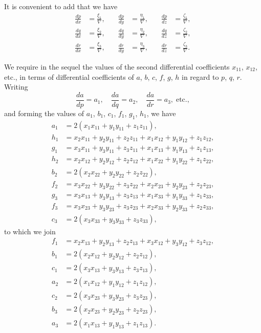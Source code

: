 \documentclass[11pt,a4paper]{article}
\theoremstyle{definition}
\theoremstyle{remark}
\begin{document}
It is convenient to add that we have
\[
\begin{aligned}
\frac{dp}{dx} &= \frac{\xi_1}{\nabla}, \quad &\frac{dp}{dy} &= \frac{\eta_1}{\nabla}, \quad &\frac{dp}{dz} &= \frac{\zeta_1}{\nabla}, \\
\frac{dq}{dx} &= \frac{\xi_2}{\nabla}, \quad &\frac{dq}{dy} &= \frac{\eta_2}{\nabla}, \quad &\frac{dq}{dz} &= \frac{\zeta_2}{\nabla}, \\
\frac{dr}{dx} &= \frac{\xi_3}{\nabla}, \quad &\frac{dr}{dy} &= \frac{\eta_3}{\nabla}, \quad &\frac{dr}{dz} &= \frac{\zeta_3}{\nabla}.
\end{aligned}
\]

We require in the sequel the values of the second differential coefficients $x_{11}$, $x_{12}$, etc., in terms of differential coefficients of $a$, $b$, $c$, $f$, $g$, $h$ in regard to $p$, $q$, $r$. Writing
\[
\frac{da}{dp} = a_1, \quad \frac{da}{dq} = a_2, \quad \frac{da}{dr} = a_3, \; \text{etc.},
\]
and forming the values of $a_1$, $b_1$, $c_1$, $f_1$, $g_1$, $h_1$, we have
\[
\begin{aligned}
a_1 &= 2(x_1 x_{11} + y_1 y_{11} + z_1 z_{11}), \\
h_1 &= x_2 x_{11} + y_2 y_{11} + z_2 z_{11} + x_1 x_{12} + y_1 y_{12} + z_1 z_{12}, \\
g_1 &= x_3 x_{11} + y_3 y_{11} + z_3 z_{11} + x_1 x_{13} + y_1 y_{13} + z_1 z_{13}, \\
h_2 &= x_2 x_{12} + y_2 y_{12} + z_2 z_{12} + x_1 x_{22} + y_1 y_{22} + z_1 z_{22}, \\
b_2 &= 2(x_2 x_{22} + y_2 y_{22} + z_2 z_{22}), \\
f_2 &= x_3 x_{22} + y_3 y_{22} + z_3 z_{22} + x_2 x_{23} + y_2 y_{23} + z_2 z_{23}, \\
g_3 &= x_3 x_{13} + y_3 y_{13} + z_3 z_{13} + x_1 x_{33} + y_1 y_{33} + z_1 z_{33}, \\
f_3 &= x_3 x_{23} + y_3 y_{23} + z_3 z_{23} + x_2 x_{33} + y_2 y_{33} + z_2 z_{33}, \\
c_3 &= 2(x_3 x_{33} + y_3 y_{33} + z_3 z_{33}),
\end{aligned}
\]
to which we join
\[
\begin{aligned}
f_1 &= x_2 x_{13} + y_2 y_{13} + z_2 z_{13} + x_3 x_{12} + y_3 y_{12} + z_3 z_{12}, \\
b_1 &= 2(x_2 x_{12} + y_2 y_{12} + z_2 z_{12}), \\
c_1 &= 2(x_3 x_{13} + y_3 y_{13} + z_3 z_{13}), \\
a_2 &= 2(x_1 x_{12} + y_1 y_{12} + z_1 z_{12}), \\
c_2 &= 2(x_3 x_{23} + y_3 y_{23} + z_3 z_{23}), \\
b_3 &= 2(x_2 x_{23} + y_2 y_{23} + z_2 z_{23}), \\
a_3 &= 2(x_1 x_{13} + y_1 y_{13} + z_1 z_{13}).
\end{aligned}
\]
\end{document}
